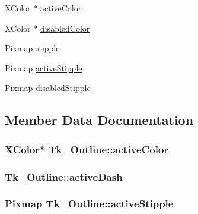 \begin{DoxyCompactItemize}
\item 
X\+Color $\ast$ \hyperlink{struct_tk___outline_ad3c00a64f63e9d4553714f2180c5ae82}{active\+Color}
\item 
X\+Color $\ast$ \hyperlink{struct_tk___outline_a35148bd3a36783777f53f7db1c6b03fc}{disabled\+Color}
\item 
Pixmap \hyperlink{struct_tk___outline_a6e54c1b95e3199debb0a3f9a330b92f8}{stipple}
\item 
Pixmap \hyperlink{struct_tk___outline_a1a0045aa6dfd0f3e8230ea52bad79f7f}{active\+Stipple}
\item 
Pixmap \hyperlink{struct_tk___outline_ac3f18b357119c46b8c038c966d351dd5}{disabled\+Stipple}
\end{DoxyCompactItemize}


\subsection{Member Data Documentation}
\subsubsection[{\texorpdfstring{active\+Color}{activeColor}}]{\setlength{\rightskip}{0pt plus 5cm}X\+Color$\ast$ Tk\+\_\+\+Outline\+::active\+Color}\hypertarget{struct_tk___outline_ad3c00a64f63e9d4553714f2180c5ae82}{}\label{struct_tk___outline_ad3c00a64f63e9d4553714f2180c5ae82}
\subsubsection[{\texorpdfstring{active\+Dash}{activeDash}}]{ Tk\+\_\+\+Outline\+::active\+Dash}\hypertarget{struct_tk___outline_ada5e71c0394238bae873ce2d0bbeb8a0}{}\label{struct_tk___outline_ada5e71c0394238bae873ce2d0bbeb8a0}
\subsubsection[{\texorpdfstring{active\+Stipple}{activeStipple}}]{\setlength{\rightskip}{0pt plus 5cm}Pixmap Tk\+\_\+\+Outline\+::active\+Stipple}\hypertarget{struct_tk___outline_a1a0045aa6dfd0f3e8230ea52bad79f7f}{}\label{struct_tk___outline_a1a0045aa6dfd0f3e8230ea52bad79f7f}
